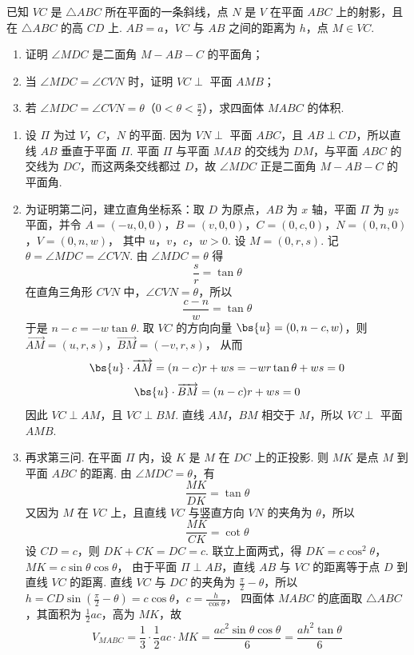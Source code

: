 \begin{problem}
已知 \(VC\) 是 \(\triangle ABC\) 所在平面的一条斜线，点 \(N\) 是 \(V\) 在平面 \(ABC\) 上的射影，且在 \(\triangle ABC\) 的高 \(CD\) 上. \(AB = a\)，\(VC\) 与 \(AB\) 之间的距离为 \(h\)，点 \(M \in VC\).

\begin{enumerate}
\item 证明 \(\angle MDC\) 是二面角 \(M - AB - C\) 的平面角；
\item 当 \(\angle MDC = \angle CVN\) 时，证明 \(VC \perp\) 平面 \(AMB\)；
\item 若 \(\angle MDC = \angle CVN = \theta\)（\(0 < \theta < \frac{\pi}{2}\)），求四面体 \(MABC\) 的体积.
\end{enumerate}

\end{problem}

\begin{solution}
\begin{enumerate}
\item
设 \(\Pi\) 为过 \(V\)，\(C\)，\(N\) 的平面. 因为 \(VN\perp\) 平面 \(ABC\)，且 \(AB\perp CD\)，所以直线 \(AB\) 垂直于平面 \(\Pi\). 平面 \(\Pi\) 与平面 \(MAB\) 的交线为 \(DM\)，与平面 \(ABC\) 的交线为 \(DC\)，而这两条交线都过 \(D\)，故 \(\angle MDC\) 正是二面角 \(M-AB-C\) 的平面角.

\item 为证明第二问，建立直角坐标系：取 \(D\) 为原点，\(AB\) 为 \(x\) 轴，平面 \(\Pi\) 为 \(yz\) 平面，并令
\(A=(-u,0,0)\)，\(B=(v,0,0)\)，\(C=(0,c,0)\)，\(N=(0,n,0)\)，\(V=(0,n,w)\)，
其中 \(u\)，\(v\)，\(c\)，\(w>0\). 设 \(M=(0,r,s)\). 记 \(\theta=\angle MDC=\angle CVN\). 由 \(\angle MDC=\theta\) 得
\[
\frac{s}{r}=\tan\theta
\]
在直角三角形 \(CVN\) 中，\(\angle CVN=\theta\)，所以
\[
\frac{c-n}{w}=\tan\theta
\]
于是 \(n-c=-w\tan\theta\). 取 \(VC\) 的方向向量 \(\bs{u}=(0,n-c,w)\)，则
\(\overrightarrow{AM}=(u,r,s)\)，\(\overrightarrow{BM}=(-v,r,s)\)，
从而
\[
\bs{u}\cdot\overrightarrow{AM}=(n-c)r+ws
=-wr\tan\theta+ws=0
\]
\[
\bs{u}\cdot\overrightarrow{BM}=(n-c)r+ws=0
\]
因此 \(VC\perp AM\)，且 \(VC\perp BM\). 直线 \(AM\)，\(BM\) 相交于 \(M\)，所以 \(VC\perp\) 平面 \(AMB\).

\item 再求第三问. 在平面 \(\Pi\) 内，设 \(K\) 是 \(M\) 在 \(DC\) 上的正投影. 则 \(MK\) 是点 \(M\) 到平面 \(ABC\) 的距离. 由 \(\angle MDC=\theta\)，有
\[
\frac{MK}{DK}=\tan\theta
\]
又因为 \(M\) 在 \(VC\) 上，且直线 \(VC\) 与竖直方向 \(VN\) 的夹角为 \(\theta\)，所以
\[
\frac{MK}{CK}=\cot\theta
\]
设 \(CD=c\)，则 \(DK+CK=DC=c\). 联立上面两式，得
\(DK=c\cos^2\theta\)，\(MK=c\sin\theta\cos\theta\)，
由于平面 \(\Pi\perp AB\)，直线 \(AB\) 与 \(VC\) 的距离等于点 \(D\) 到直线 \(VC\) 的距离. 直线 \(VC\) 与 \(DC\) 的夹角为 \(\frac{\pi}{2}-\theta\)，所以
\(h=CD\sin\left(\frac{\pi}{2}-\theta\right)=c\cos\theta\)，\(c=\frac{h}{\cos\theta}\)，
四面体 \(MABC\) 的底面取 \(\triangle ABC\)，其面积为 \(\frac12ac\)，高为 \(MK\)，故
\[
V_{MABC}=\frac13\cdot\frac12ac\cdot MK
=\frac{ac^2\sin\theta\cos\theta}{6}
=\frac{ah^2\tan\theta}{6}
\]
\end{enumerate}
\end{solution}

